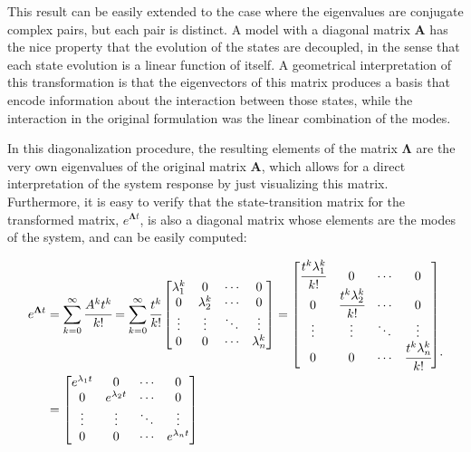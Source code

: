 \documentclass[a4paper,11pt]{book}
\numberwithin{figure}{chapter}
\numberwithin{equation}{chapter}
\numberwithin{table}{chapter}
\theoremstyle{definition}
\begin{document}
This result can be easily extended to the case where the eigenvalues are conjugate complex pairs, but each pair is distinct. A model with a diagonal matrix $\bm{A}$ has the nice property that the evolution of the states are decoupled, in the sense that each state evolution is a linear function of itself. A geometrical interpretation of this transformation is that the eigenvectors of this matrix produces a basis that encode information about the interaction between those states, while the interaction in the original formulation was the linear combination of the modes. 

In this diagonalization procedure, the resulting elements of the matrix $\bm{\Lambda}$ are the very own eigenvalues of the original matrix $\bm{A}$, which allows for a direct interpretation of the system response by just visualizing this matrix. Furthermore, it is easy to verify that the state-transition matrix for the transformed matrix, $e^{\bm{\Lambda} t}$, is also a diagonal matrix whose elements are the modes of the system, and can be easily computed:

\begin{align}
\begin{split}
    e^{\bm{\Lambda} t} & = \sum_{k=0}^{\infty} \cfrac{A^k t^k}{k!   }  = \sum_{k=0}^{\infty} \cfrac{t^k}{k!} \begin{bmatrix} \lambda_1^k & 0 & \cdots & 0 \\ 0 & \lambda_2^k & \cdots & 0 \\ \vdots & \vdots & \ddots & \vdots \\ 0 & 0 & \cdots & \lambda_n^k  \end{bmatrix} = \begin{bmatrix} \cfrac{t^k\lambda_1^k}{k!} & 0 & \cdots & 0 \\ 0 & \cfrac{t^k\lambda_2^k}{k!} & \cdots & 0 \\ \vdots & \vdots & \ddots & \vdots \\ 0 & 0 & \cdots & \cfrac{t^k\lambda_n^k}{k!} \end{bmatrix} \\ 
    &= \begin{bmatrix} e^{\lambda_1 t} & 0 & \cdots & 0 \\ 0 & e^{\lambda_2 t} & \cdots & 0 \\ \vdots & \vdots & \ddots & \vdots \\ 0 & 0 & \cdots & e^{\lambda_n t} \end{bmatrix}
\end{split}
.\end{align}
\end{document}
